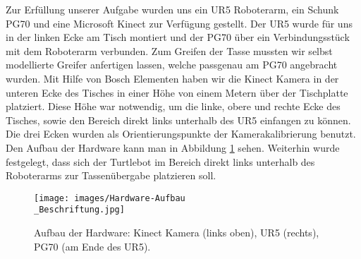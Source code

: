 Zur Erfüllung unserer Aufgabe wurden uns ein UR5 Roboterarm, ein Schunk PG70 und eine Microsoft Kinect zur Verfügung gestellt. Der UR5 wurde für uns in der linken Ecke am Tisch montiert und der PG70 über ein Verbindungsstück mit dem Roboterarm verbunden. Zum Greifen der Tasse mussten wir selbst modellierte Greifer anfertigen lassen, welche passgenau am PG70 angebracht wurden. Mit Hilfe von Bosch Elementen haben wir die Kinect Kamera in der unteren Ecke des Tisches in einer Höhe von einem Metern über der Tischplatte platziert. Diese Höhe war notwendig, um die linke, obere und rechte Ecke des Tisches, sowie den Bereich direkt links unterhalb des UR5 einfangen zu können. Die drei Ecken wurden als Orientierungspunkte der Kamerakalibrierung benutzt. Den Aufbau der Hardware kann man in Abbildung \ref{Hardware} sehen.
\newline
Weiterhin wurde festgelegt, dass sich der Turtlebot im Bereich direkt links unterhalb des Roboterarms zur Tassenübergabe platzieren soll.
\begin{figure}
	\centering
	\texttt{[image: images/Hardware-Aufbau\\\_Beschriftung.jpg]}
	\caption{Aufbau der Hardware: Kinect Kamera (links oben), UR5 (rechts), PG70 (am Ende des UR5).}
	\label{Hardware}
\end{figure}